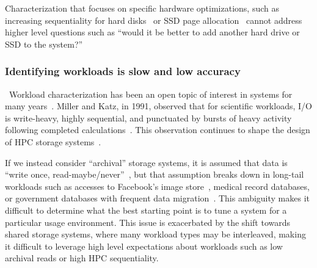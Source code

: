 Characterization that focuses on specific hardware optimizations, such as
increasing sequentiality for hard disks~\cite{riska2006disk} or SSD page
allocation~\cite{seo_char} cannot address higher level questions such as ``would
it be better to add another hard drive or SSD to the system?''
\subsubsection*{Identifying workloads is slow and low accuracy}\
Workload characterization has been an open topic of interest in systems for many
years~\cite{ganger1995generating,wang2004storage,tarasov2012extracting}.  Miller
and Katz, in 1991, observed that for scientific workloads, I/O is write-heavy,
highly sequential, and punctuated by bursts of heavy activity following
completed calculations~\cite{millersc91,gunaskaramcaches11,rothpdsw07}.  This
observation continues to shape the design of HPC storage
systems~\cite{gunaskaramcaches11}.

If we instead consider
``archival'' storage systems, it is assumed that data is ``write once,
read-maybe/never''~\cite{storerfast2008,venti,deepstore}, but that assumption
breaks down in long-tail workloads such as accesses to Facebook's image
store~\cite{facebook-photocache-SOSP}, medical record databases,  or government databases with frequent
data migration~\cite{ian-tos}.  
This ambiguity makes it difficult to determine
what the best starting point is to tune a system for a particular usage
environment.  %
This issue is exacerbated by the
shift towards shared storage systems, where many workload types may be
interleaved, making it difficult to leverage high level expectations about
workloads such as low archival reads or high HPC sequentiality.%


